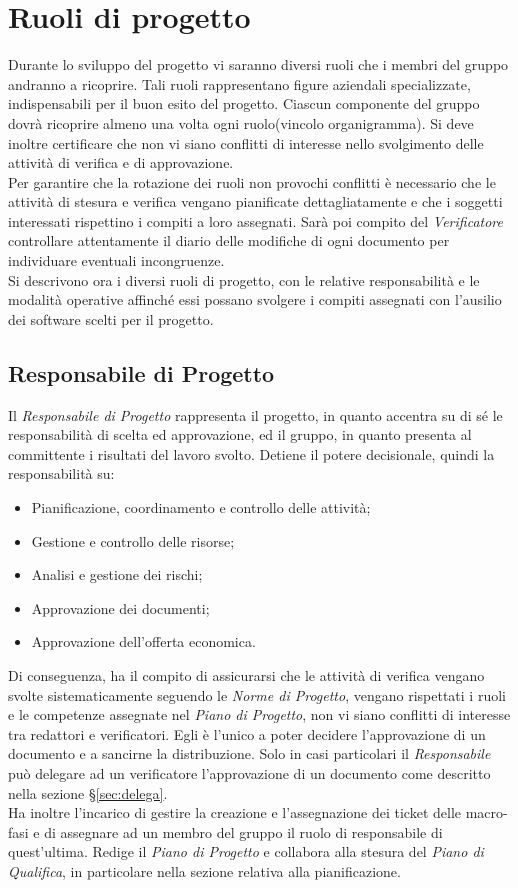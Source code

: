 \section{Ruoli di progetto}
Durante lo sviluppo del progetto vi saranno diversi ruoli che i membri del gruppo andranno a ricoprire. Tali ruoli rappresentano figure aziendali specializzate, indispensabili per il buon esito del progetto. Ciascun componente del gruppo dovrà ricoprire almeno una volta ogni ruolo(vincolo organigramma). Si deve inoltre certificare che non vi siano conflitti di interesse nello svolgimento delle attività di verifica e di approvazione.\\
Per garantire che la rotazione dei ruoli non provochi conflitti è necessario che le attività di stesura e verifica vengano pianificate dettagliatamente e che i soggetti interessati rispettino i compiti a loro assegnati. Sarà poi compito del \textit{Verificatore} controllare attentamente il diario delle modifiche di ogni documento per individuare eventuali incongruenze.\\
Si descrivono ora i diversi ruoli di progetto, con le relative responsabilità e le modalità operative affinché essi possano svolgere i compiti assegnati con l'ausilio dei software scelti per il progetto.
\subsection{Responsabile di Progetto}
Il \textit{Responsabile di Progetto} rappresenta il progetto, in quanto accentra su di sé le responsabilità di scelta ed approvazione, ed il gruppo, in quanto presenta al committente i risultati del lavoro svolto.
Detiene il potere decisionale, quindi la responsabilità su:
\begin{itemize}
\item Pianificazione, coordinamento e controllo delle attività;
\item Gestione e controllo delle risorse;
\item Analisi e gestione dei rischi;
\item Approvazione dei documenti;
\item Approvazione dell'offerta economica.
\end{itemize}
Di conseguenza, ha il compito di assicurarsi che le attività di verifica vengano svolte sistematicamente seguendo le \textit{Norme di Progetto}, vengano rispettati i ruoli e le competenze assegnate nel \textit{Piano di Progetto}, non vi siano conflitti di interesse tra redattori e verificatori. Egli è l'unico a poter decidere l'approvazione di un documento e a sancirne
la distribuzione. Solo in casi particolari il \textit{Responsabile} può delegare ad un verificatore l'approvazione di un documento come descritto nella sezione \S\ref{sec:delega}. \\
Ha inoltre l'incarico di gestire la creazione e l'assegnazione dei ticket delle macro-fasi e di assegnare ad un membro del gruppo il ruolo di responsabile di quest’ultima.
Redige il \textit{Piano di Progetto} e collabora alla stesura del \textit{Piano di Qualifica}, in particolare nella sezione relativa alla pianificazione.

